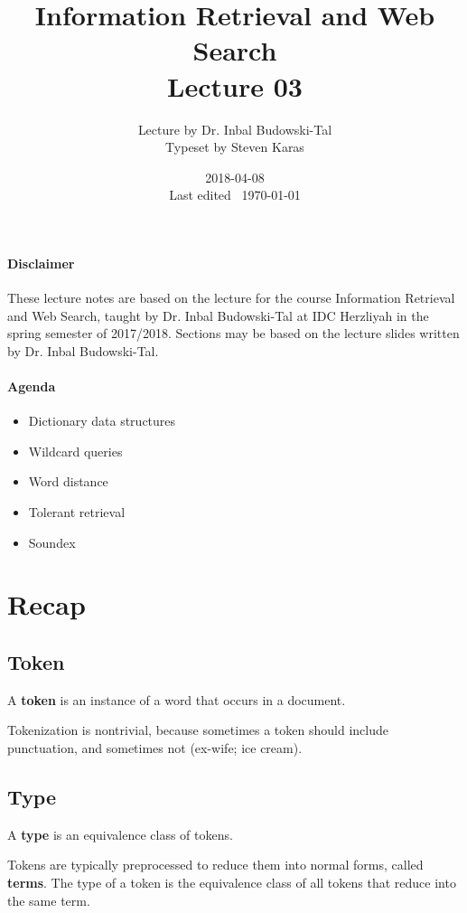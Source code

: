 \documentclass{idc_msc}
\title{Information Retrieval and Web Search\\\large Lecture 03}
\date{2018-04-08 \\ Last edited \currenttime\ \today}
\author{Lecture by Dr. Inbal Budowski-Tal\\Typeset by Steven Karas}
\begin{document}
\maketitle

\paragraph{Disclaimer}

These lecture notes are based on the lecture for the course Information Retrieval and Web Search, taught by Dr. Inbal Budowski-Tal at IDC Herzliyah in the spring semester of 2017/2018.
Sections may be based on the lecture slides written by Dr. Inbal Budowski-Tal.

\paragraph{Agenda}

\begin{itemize}
  \item Dictionary data structures
  \item Wildcard queries
  \item Word distance
  \item Tolerant retrieval
  \item Soundex
\end{itemize}

\nocite{manning2008introduction}

\section{Recap}

\subsection{Token}

A \textbf{token} is an instance of a word that occurs in a document.

Tokenization is nontrivial, because sometimes a token should include punctuation, and sometimes not (ex-wife; ice cream).

\subsection{Type}

A \textbf{type} is an equivalence class of tokens.

Tokens are typically preprocessed to reduce them into normal forms, called \textbf{terms}.
The type of a token is the equivalence class of all tokens that reduce into the same term.
\end{document}
